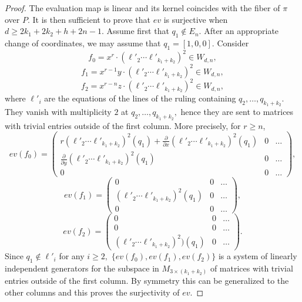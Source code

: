 \documentclass[10pt,a4paper,twoside]{amsart}
\theoremstyle{plain}
\theoremstyle{definition}
\theoremstyle{remark}
\begin{document}
\begin{proof}
The evaluation map is linear and its kernel coincides with the fiber of $\pi$ over $P$. It is then sufficient to prove that $ev$ is surjective when $d\geq 2k_1+2k_2+h+2n-1$. Assume first that $q_1\not\in E_n$. After an appropriate change of coordinates, we may assume that $q_1=\left[1,0,0\right]$.
Consider 
$$f_0=x^r\cdot (\ell'_2\cdots\ell'_{k_1+k_2})^2 \in W_{d,n},$$
$$f_1=x^{r-1}y\cdot(\ell'_2\cdots\ell'_{k_1+k_2})^2\in W_{d,n},$$
$$f_2=x^{r-n}z\cdot(\ell'_2\cdots\ell'_{k_1+k_2})^2\in W_{d,n},$$
where $\ell'_i$ are the equations of the lines of the ruling containing $q_2,\dots,q_{k_1+k_2}$. They vanish with multiplicity $2$ at $q_2,\dots,q_{k_1+k_2},$ hence they are sent to matrices with trivial entries outside of the first column. More precisely, for $r\geq n$,
\begin{equation*}
ev(f_0)=\begin{pmatrix}r(\ell'_2\cdots\ell'_{k_1+k_2})^2(q_1)+\frac{\partial}{\partial x}(\ell'_2\cdots\ell'_{k_1+k_2})^2(q_1)&0&\dots\\ \frac{\partial}{\partial y}(\ell'_2\cdots\ell'_{k_1+k_2})^2(q_1)&0&\dots\\ 0&0&\dots\end{pmatrix},
\end{equation*}
\begin{equation*}
ev(f_1)=\begin{pmatrix}0&0&\dots\\ (\ell'_2\cdots\ell'_{k_1+k_2})^2(q_1)&0&\dots\\ 0&0&\dots\end{pmatrix},
\end{equation*}
\begin{equation*}
ev(f_2)=\begin{pmatrix}0&0&\dots\\ 0&0&\dots\\(\ell'_2\cdots\ell'_{k_1+k_2})^2)(q_1)&0&\dots\end{pmatrix}.
\end{equation*}
Since $q_1\not\in\ell'_i$ for any $i\geq2,$ $\{ev(f_0),ev(f_1),ev(f_2)\}$ is a system of linearly independent generators for the subspace in $M_{3\times ({k_1+k_2})}$ of matrices with trivial entries outside of the first column. By symmetry this can be generalized to the other columns and this proves the surjectivity of $ev$.


\end{proof}
\end{document}

